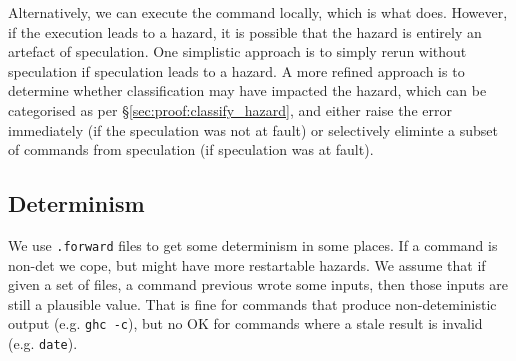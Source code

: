 Alternatively, we can execute the command locally, which is what \Rattle does. However, if the execution leads to a hazard, it is possible that the hazard is entirely an artefact of speculation. One simplistic approach is to simply rerun without speculation if speculation leads to a hazard. A more refined approach is to determine whether classification may have impacted the hazard, which can be categorised as per \S\ref{sec:proof:classify_hazard}, and either raise the error immediately (if the speculation was not at fault) or selectively eliminte a subset of commands from speculation (if speculation was at fault).

\subsection{Determinism}
\label{sec:determinism}

We use \texttt{.forward} files to get some determinism in some places. If a command is non-det we cope, but might have more restartable hazards. We assume that if given a set of files, a command previous wrote some inputs, then those inputs are still a plausible value. That is fine for commands that produce non-deteministic output (e.g. \texttt{ghc -c}), but no OK for commands where a stale result is invalid (e.g. \texttt{date}).
